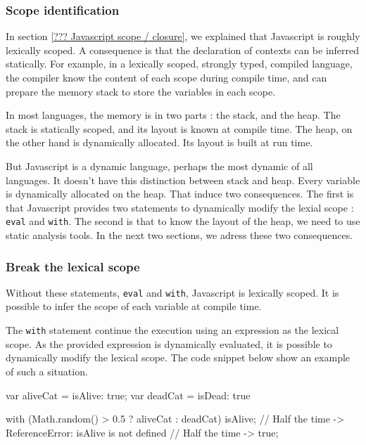 \subsubsection{Scope identification}

In section \ref{??? Javascript scope / closure}, we explained that Javascript is roughly lexically scoped.
A consequence is that the declaration of contexts can be inferred statically.
For example, in a lexically scoped, strongly typed, compiled language, the compiler know the content of each scope during compile time, and can prepare the memory stack to store the variables in each scope.

In most languages, the memory is in two parts : the stack, and the heap.
The stack is statically scoped, and its layout is known at compile time.
The heap, on the other hand is dynamically allocated. Its layout is built at run time.

But Javascript is a dynamic language, perhaps the most dynamic of all languages.
It doesn't have this distinction between stack and heap. Every variable is dynamically allocated on the heap.
That induce two consequences.
The first is that Javascript provides two statements to dynamically modify the lexial scope : \texttt{eval} and \texttt{with}.
The second is that to know the layout of the heap, we need to use static analysis tools.
In the next two sections, we adress these two consequences.

\subsubsection{Break the lexical scope} \label{???:breakscope}

Without these statements, \texttt{eval} and \texttt{with}, Javascript is lexically scoped. It is possible to infer the scope of each variable at compile time.


The \texttt{with} statement continue the execution using an expression as the lexical scope.
As the provided expression is dynamically evaluated, it is possible to dynamically modify the lexical scope.
The code snippet below show an example of such a situation.

\begin{code}
var aliveCat = {isAlive: true};
var deadCat = {isDead: true}

with (Math.random() > 0.5 ? aliveCat : deadCat) {
  isAlive;
  // Half the time -> ReferenceError: isAlive is not defined
  // Half the time -> true;
}
\end{code}

